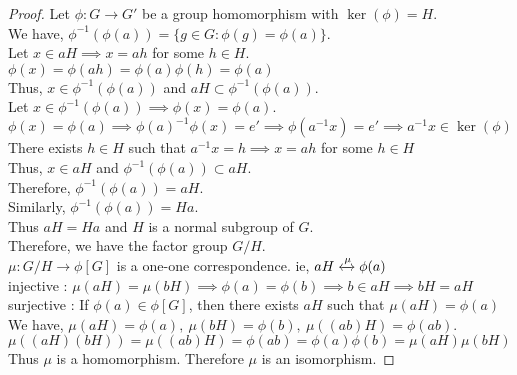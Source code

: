 \begin{proof}
	Let $\phi : G \to G'$ be a group homomorphism with $\ker(\phi) = H$.\\
	We have, $\phi^{-1}(\phi(a)) = \{ g \in G : \phi(g) = \phi(a) \}$.\\

	Let $x \in aH \implies x = ah$ for some $h \in H$.\\
	$\phi(x) = \phi(ah) = \phi(a)\phi(h) = \phi(a)$\\
	Thus, $x \in \phi^{-1}(\phi(a))$ and $aH \subset \phi^{-1}(\phi(a))$.\\

	Let $x \in \phi^{-1}(\phi(a)) \implies \phi(x) = \phi(a)$.\\
	$\phi(x) = \phi(a) \implies \phi(a)^{-1} \phi(x) = e' \implies \phi(a^{-1}x) = e' \implies a^{-1}x \in \ker(\phi)$\\
	There exists $h \in H$ such that $a^{-1}x = h \implies x = ah$ for some $h \in H$\\
	Thus, $x \in aH$ and $\phi^{-1}(\phi(a)) \subset aH$.\\
	Therefore, $\phi^{-1}(\phi(a)) = aH$.\\
	
	Similarly, $\phi^{-1}(\phi(a)) = Ha$.\\
	Thus $aH = Ha$ and $H$ is a normal subgroup of $G$.\\
	Therefore, we have the factor group $G/H$.\\

	$\mu : G/H \to \phi[G]$ is a one-one correspondence. ie, $aH \xleftrightarrow{\mu} \phi(a)$\\
	injective : $\mu(aH) = \mu(bH) \implies \phi(a) = \phi(b) \implies b \in aH \implies bH = aH$\\
	surjective : If $\phi(a) \in \phi[G]$, then there exists $aH$ such that  $\mu(aH) = \phi(a)$\\

	We have, $\mu(aH) = \phi(a),\ \mu(bH) = \phi(b),\ \mu((ab)H)  = \phi(ab)$.\\
	$\mu((aH)(bH)) = \mu((ab)H) = \phi(ab) = \phi(a)\phi(b) = \mu(aH)\mu(bH)$\\
	Thus $\mu$ is a homomorphism. Therefore $\mu$ is an isomorphism.
\end{proof}

